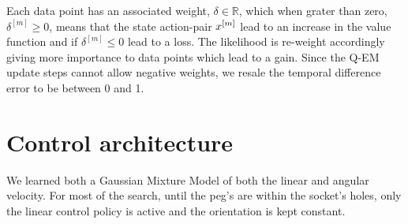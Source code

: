 Each data point has an associated weight, $\delta \in \mathbb{R}$, which when grater than zero, $\delta^{[m]} \geq 0$, means that the 
state action-pair $x^{[m]}$ lead to an increase in the value function and if $\delta^{[m]} \leq 0$ lead to 
a loss. The likelihood is re-weight accordingly giving more importance to data points which lead to a gain. Since 
the Q-EM update steps cannot allow negative weights, we resale the temporal difference error to be between 0 and 1.


\section{Control architecture}\label{seq:control_architecture}

We learned both a Gaussian Mixture Model of both the linear and angular 
velocity. For most of the search, until the peg's are within the socket's holes, only 
the linear control policy is active and the orientation is kept constant.

